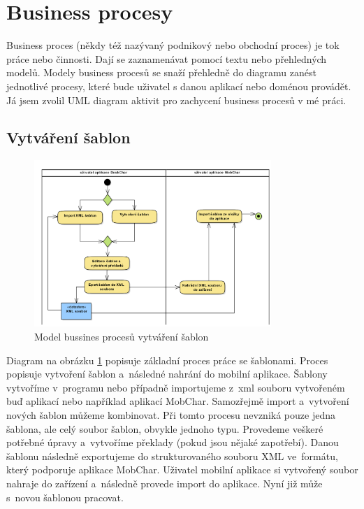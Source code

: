 \documentclass[thesis=B,czech]{resources/FITthesis}[2012/06/26]
\begin{document}
	\section{Business procesy}
Business proces (někdy též nazývaný podnikový nebo obchodní proces) je tok práce nebo činnosti. Dají se zaznamenávat pomocí textu nebo přehledných modelů. Modely business procesů se snaží přehledně do diagramu zanést jednotlivé procesy, které bude uživatel s danou aplikací nebo doménou provádět. Já jsem zvolil UML diagram aktivit pro zachycení business procesů v mé práci.
\subsection{Vytváření šablon} \label{sec:vytvareni_sablon}
\begin{figure}\centering
	\includegraphics[width=0.8\textwidth]{images/bussiness_sablony}
	\caption[Business proces vytváření šablon]{Model bussines procesů vytváření šablon}\label{fig:bp_sablony}
\end{figure}
Diagram na obrázku \ref{fig:bp_sablony} popisuje základní proces práce se šablonami. Proces popisuje vytvoření šablon a~následné nahrání do mobilní aplikace. Šablony vytvoříme v~programu nebo případně importujeme z~xml souboru vytvořeném buď aplikací nebo například aplikací MobChar. Samozřejmě import a~vytvoření nových šablon můžeme kombinovat. Při tomto procesu nevzniká pouze jedna šablona, ale celý soubor šablon, obvykle jednoho typu. Provedeme veškeré potřebné úpravy a~vytvoříme překlady (pokud jsou nějaké zapotřebí). Danou šablonu následně exportujeme do strukturovaného souboru XML ve~formátu, který podporuje aplikace MobChar. Uživatel mobilní aplikace si vytvořený soubor nahraje do zařízení a~následně provede import do aplikace. Nyní již může s~novou šablonou pracovat.
\end{document}
